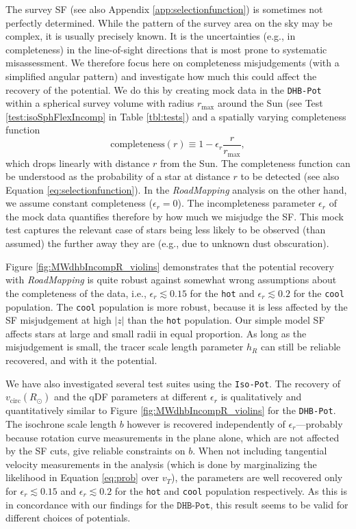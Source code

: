 \documentclass[iop,revtex4,numberedappendix,appendixfloats]{emulateapj}
\newcommand{\RM}{{\sl RoadMapping}}
\begin{document}
The survey SF (see also Appendix \ref{app:selectionfunction}) is sometimes not perfectly determined. While the pattern of the survey area on the sky may be complex, it is usually precisely known. It is the uncertainties (e.g., in completeness) in the line-of-sight directions that is most prone to systematic misassessment. We therefore focus here on completeness misjudgements (with a simplified angular pattern) and investigate how much this could affect the recovery of the potential. We do this by creating mock data in the \texttt{DHB-Pot} within a spherical survey volume with radius $r_\text{max}$ around the Sun (see Test \ref{test:isoSphFlexIncomp} in Table \ref{tbl:tests}) and a spatially varying completeness function
\begin{equation}
\text{completeness}(r) \equiv 1- \epsilon_r \frac{r}{r_\text{max}}, \label{eq:rad_incomp}
\end{equation}
which drops linearly with distance $r$ from the Sun. The completeness function can be understood as the probability of a star at distance $r$ to be detected (see also Equation \ref{eq:selectionfunction}). In the \RM{} analysis on the other hand, we assume constant completeness ($\epsilon_r=0$). The incompleteness parameter $\epsilon_r$ of the mock data quantifies therefore by how much we misjudge the SF. This mock test captures the relevant case of stars being less likely to be observed (than assumed) the further away they are (e.g., due to unknown dust obscuration). 

Figure \ref{fig:MWdhbIncompR_violins} demonstrates that the potential recovery with \RM{} is quite robust against somewhat wrong assumptions about the completeness of the data, i.e., $\epsilon_r \lesssim 0.15$ for the \texttt{hot} and $\epsilon_r \lesssim 0.2$ for the \texttt{cool} population. The \texttt{cool} population is more robust, because it is less affected by the SF misjudgement at high $|z|$ than the \texttt{hot} population. Our simple model SF affects stars at large and small radii in equal proportion. As long as the misjudgement is small, the tracer scale length parameter $h_R$ can still be reliable recovered, and with it the potential.

We have also investigated several test suites using the \texttt{Iso-Pot}. The recovery of $v_\text{circ}(R_\odot)$ and the qDF parameters at different $\epsilon_r$ is qualitatively and quantitatively similar to Figure \ref{fig:MWdhbIncompR_violins} for the \texttt{DHB-Pot}. The isochrone scale length $b$ however is recovered independently of $\epsilon_r$---probably because rotation curve measurements in the plane alone, which are not affected by the SF cuts, give reliable constraints on $b$. When not including tangential velocity measurements in the analysis (which is done by marginalizing the likelihood in Equation \eqref{eq:prob} over $v_T$), the parameters are well recovered only for $\epsilon_r \lesssim 0.15$ and $\epsilon_r \lesssim 0.2$ for the \texttt{hot} and \texttt{cool} population respectively. As this is in concordance with our findings for the $\texttt{DHB-Pot}$, this result seems to be valid for different choices of potentials.
\end{document}
